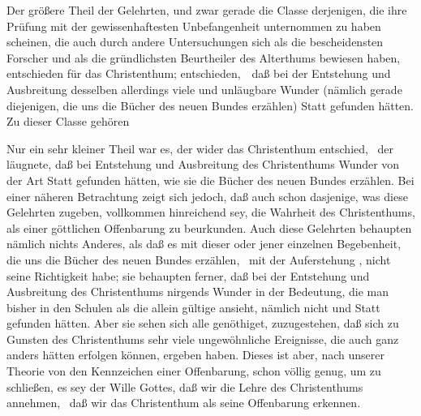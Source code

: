 \begin{aufza}
\item Der größere Theil der Gelehrten, und zwar gerade die Classe derjenigen, die ihre Prüfung mit der gewissenhaftesten Unbefangenheit unternommen zu haben scheinen, die auch durch andere Untersuchungen sich als die bescheidensten Forscher und als die gründlichsten Beurtheiler des Alterthums bewiesen haben, entschieden für das Christenthum; entschieden,~\ daß bei der Entstehung und Ausbreitung desselben allerdings viele und unläugbare Wunder (nämlich gerade diejenigen, die uns die Bücher des neuen Bundes erzählen) Statt gefunden hätten. Zu dieser Classe gehören \zB\ 
\item Nur ein sehr kleiner Theil war es, der wider das Christenthum entschied, \dh\ der läugnete, daß bei Entstehung und Ausbreitung des Christenthums Wunder von der Art Statt gefunden hätten, wie sie die Bücher des neuen Bundes erzählen. Bei einer näheren Betrachtung zeigt sich jedoch, daß auch schon dasjenige, was diese Gelehrten zugeben, vollkommen hinreichend sey, die Wahrheit des Christenthums, als einer göttlichen Offenbarung zu beurkunden. Auch diese Gelehrten behaupten nämlich nichts Anderes, als daß es mit dieser oder jener einzelnen Begebenheit, die uns die Bücher des neuen Bundes erzählen, \zB\ mit der Auferstehung , nicht seine Richtigkeit habe; sie behaupten ferner, daß bei der Entstehung und Ausbreitung des Christenthums nirgends Wunder in der Bedeutung, die man bisher in den Schulen als die allein gültige ansieht, nämlich nicht  und  Statt gefunden hätten. Aber sie sehen sich alle genöthiget, zuzugestehen, daß sich zu Gunsten des Christenthums sehr viele ungewöhnliche Ereignisse, die auch ganz anders hätten erfolgen können, ergeben haben. Dieses ist aber, nach unserer Theorie von den Kennzeichen einer Offenbarung, schon völlig genug, um zu schließen, es sey der Wille Gottes, daß wir die Lehre des Christenthums annehmen, \dh\ daß wir das Christenthum als seine Offenbarung erkennen.
\end{aufza}

